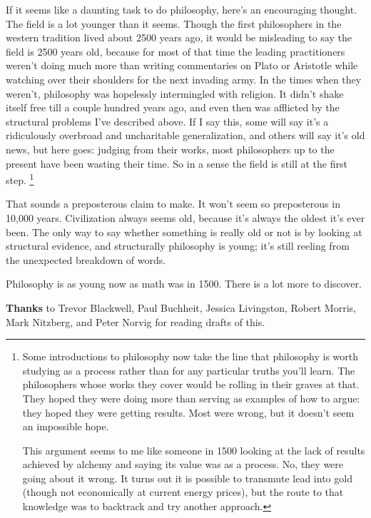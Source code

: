 If it seems like a daunting task to do philosophy, here's an encouraging
thought. The field is a lot younger than it seems. Though the first
philosophers in the western tradition lived about 2500 years ago, it
would be misleading to say the field is 2500 years old, because for most
of that time the leading practitioners weren't doing much more than
writing commentaries on Plato or Aristotle while watching over their
shoulders for the next invading army. In the times when they weren't,
philosophy was hopelessly intermingled with religion. It didn't shake
itself free till a couple hundred years ago, and even then was afflicted
by the structural problems I've described above. If I say this, some
will say it's a ridiculously overbroad and uncharitable generalization,
and others will say it's old news, but here goes: judging from their
works, most philosophers up to the present have been wasting their time.
So in a sense the field is still at the first step.
\footnote{Some introductions to philosophy now take the line that
philosophy is worth studying as a process rather than for any particular
truths you'll learn. The philosophers whose works they cover would be
rolling in their graves at that. They hoped they were doing more than
serving as examples of how to argue: they hoped they were getting
results. Most were wrong, but it doesn't seem an impossible hope.

This argument seems to me like someone in 1500 looking at the lack of
results achieved by alchemy and saying its value was as a process. No,
they were going about it wrong. It turns out it is possible to transmute
lead into gold (though not economically at current energy prices), but
the route to that knowledge was to backtrack and try another approach.}

That sounds a preposterous claim to make. It won't seem so preposterous
in 10,000 years. Civilization always seems old, because it's always the
oldest it's ever been. The only way to say whether something is really
old or not is by looking at structural evidence, and structurally
philosophy is young; it's still reeling from the unexpected breakdown of
words.

Philosophy is as young now as math was in 1500. There is a lot more to
discover.


\textbf{Thanks} to Trevor Blackwell, Paul Buchheit, Jessica Livingston,
Robert Morris, Mark Nitzberg, and Peter Norvig for reading drafts of
this.
